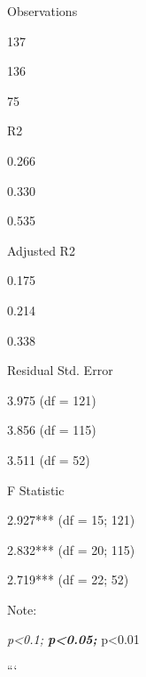 \documentclass[
]{article}
\begin{document}
Observations

137

136

75

R2

0.266

0.330

0.535

Adjusted R2

0.175

0.214

0.338

Residual Std. Error

3.975 (df = 121)

3.856 (df = 115)

3.511 (df = 52)

F Statistic

2.927*** (df = 15; 121)

2.832*** (df = 20; 115)

2.719*** (df = 22; 52)

Note:

\emph{p\textless0.1; \textbf{p\textless0.05; }}p\textless0.01

```
\end{document}
